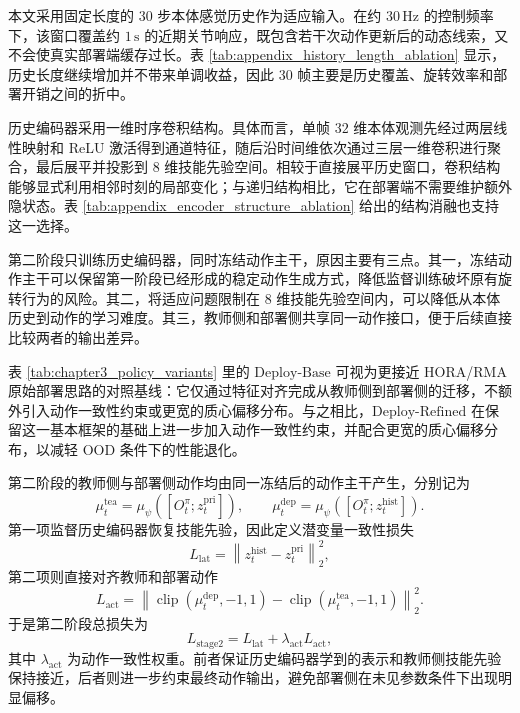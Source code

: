 本文采用固定长度的 \(30\) 步本体感觉历史作为适应输入。在约 \(30\,\mathrm{Hz}\) 的控制频率下，该窗口覆盖约 \(1\,\mathrm{s}\) 的近期关节响应，既包含若干次动作更新后的动态线索，又不会使真实部署端缓存过长。表 \ref{tab:appendix_history_length_ablation} 显示，历史长度继续增加并不带来单调收益，因此 \(30\) 帧主要是历史覆盖、旋转效率和部署开销之间的折中。

历史编码器采用一维时序卷积结构。具体而言，单帧 \(32\) 维本体观测先经过两层线性映射和 ReLU 激活得到通道特征，随后沿时间维依次通过三层一维卷积进行聚合，最后展平并投影到 \(8\) 维技能先验空间。相较于直接展平历史窗口，卷积结构能够显式利用相邻时刻的局部变化；与递归结构相比，它在部署端不需要维护额外隐状态。表 \ref{tab:appendix_encoder_structure_ablation} 给出的结构消融也支持这一选择。

第二阶段只训练历史编码器，同时冻结动作主干，原因主要有三点。其一，冻结动作主干可以保留第一阶段已经形成的稳定动作生成方式，降低监督训练破坏原有旋转行为的风险。其二，将适应问题限制在 \(8\) 维技能先验空间内，可以降低从本体历史到动作的学习难度。其三，教师侧和部署侧共享同一动作接口，便于后续直接比较两者的输出差异。

表 \ref{tab:chapter3_policy_variants} 里的 \(\mathrm{Deploy\text{-}Base}\) 可视为更接近 HORA/RMA 原始部署思路的对照基线：它仅通过特征对齐完成从教师侧到部署侧的迁移，不额外引入动作一致性约束或更宽的质心偏移分布。与之相比，\(\mathrm{Deploy\text{-}Refined}\) 在保留这一基本框架的基础上进一步加入动作一致性约束，并配合更宽的质心偏移分布，以减轻 OOD 条件下的性能退化。

第二阶段的教师侧与部署侧动作均由同一冻结后的动作主干产生，分别记为
\begin{equation}
\mu_t^{\mathrm{tea}} =
\mu_\psi\!\left([O_t^\pi;z_t^{\mathrm{pri}}]\right),
\qquad
\mu_t^{\mathrm{dep}} =
\mu_\psi\!\left([O_t^\pi;z_t^{\mathrm{hist}}]\right).
\end{equation}
第一项监督历史编码器恢复技能先验，因此定义潜变量一致性损失
\begin{equation}
L_{\mathrm{lat}}
=
\left\|
z_t^{\mathrm{hist}}-z_t^{\mathrm{pri}}
\right\|_2^2,
\end{equation}
第二项则直接对齐教师和部署动作
\begin{equation}
L_{\mathrm{act}}
=
\left\|
\operatorname{clip}(\mu_t^{\mathrm{dep}},-1,1)
-
\operatorname{clip}(\mu_t^{\mathrm{tea}},-1,1)
\right\|_2^2.
\end{equation}
于是第二阶段总损失为
\begin{equation}
L_{\mathrm{stage2}}
=
L_{\mathrm{lat}}
+\lambda_{\mathrm{act}}L_{\mathrm{act}},
\end{equation}
其中 \(\lambda_{\mathrm{act}}\) 为动作一致性权重。前者保证历史编码器学到的表示和教师侧技能先验保持接近，后者则进一步约束最终动作输出，避免部署侧在未见参数条件下出现明显偏移。


